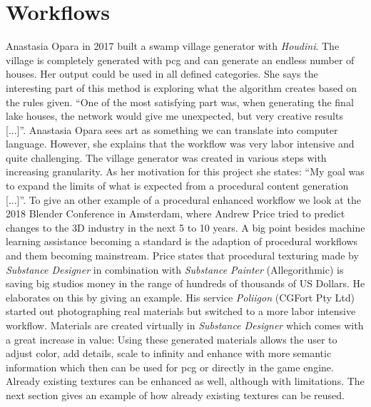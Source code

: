 \documentclass[10pt,a4paper]{article}
\begin{document}
\section{Workflows}\label{sec:workflows}
\begin{multicols}{2}
Anastasia Opara in 2017 built a swamp village generator with \textit{Houdini}. The village is completely generated with \gls{pcg} and can generate an endless number of houses. Her output could be used in all defined categories. She says the interesting part of this method is exploring what the algorithm creates based on the rules given. “One of the most satisfying part was, when generating the final lake houses, the network would give me unexpected, but very creative results [...]”\cite{Opara2016}. Anastasia Opara sees art as something we can translate into computer language. However, she explains that the workflow was very labor intensive and quite challenging. The village generator was created in various steps with increasing granularity. As her motivation for this project she states: “My goal was to expand the limits of what is expected from a procedural content generation [...]”\cite{Opara2017}. To give an other example of a procedural enhanced workflow we look at the 2018 Blender Conference in Amsterdam, where Andrew Price tried to predict changes to the 3D industry in the next 5 to 10 years. A big point besides machine learning assistance becoming a standard is the adaption of procedural workflows and them becoming mainstream\cite{Price2018}. Price states that procedural texturing made by \textit{Substance Designer} in combination with \textit{Substance Painter} (Allegorithmic) is saving big studios money in the range of hundreds of thousands of US Dollars. He elaborates on this by giving an example. His service \textit{Poliigon} (CGFort Pty Ltd) started out photographing real materials but switched to a more labor intensive workflow. Materials are created virtually in \textit{Substance Designer} which comes with a great increase in value: Using these generated materials allows the user to adjust color, add details, scale to infinity and enhance with more semantic information which then can be used for \gls{pcg} or directly in the game engine. Already existing textures can be enhanced as well, although with limitations. The next section gives an example of how already existing textures can be reused.
\end{multicols}
\end{document}
